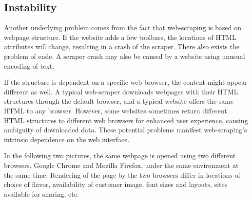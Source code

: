 \documentclass[12pt]{report}
\begin{document}
\subsection{Instability}
Another underlying problem comes from the fact that web-scraping is based on webpage structure. If the website adds a few toolbars, the locations of HTML attributes will change, resulting in a crash of the scraper. There also exists the problem of \gls{ende}. A scraper crash may also be caused by a website using unusual encoding of text. 

If the structure is dependent on a specific web browser, the content might appear different as well. A typical web-scraper downloads webpages with their HTML structures through the default browser, and a typical website offers the same HTML to any browser. However, some websites sometimes return different HTML structures to different web browsers for enhanced user experience, causing ambiguity of downloaded data. These potential problems manifest web-scraping's intrinsic dependence on the web interface.

In the following two pictures, the same webpage is opened using two different browsers, Google Chrome and Mozilla Firefox, under the same environment at the same time. Rendering of the page by the two browsers differ in locations of choice of flavor, availability of customer image, font sizes and layouts, sites available for sharing, etc.
\end{document}
